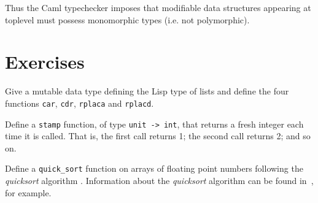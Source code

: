 Thus the Caml typechecker imposes that modifiable data structures appearing
at toplevel must possess monomorphic types (i.e. not polymorphic).



\section*{Exercises}

\begin{exo}\label{Annot:4}
Give a mutable data type defining the Lisp type of lists and define
the four functions {\tt car}, {\tt cdr}, {\tt rplaca} and {\tt rplacd}.
\end{exo}

\begin{exo}\label{Annot:5}
Define a \verb"stamp" function, of type \verb"unit -> int", that
returns a fresh integer each time it is called. That is, the first
call returns 1; the second call returns 2; and so on.
\end{exo}

\begin{exo}\label{Annot:6}
Define a \verb|quick_sort| function on arrays of floating point
numbers following the {\em quicksort} algorithm \cite{Quicksort}.
Information about the {\em quicksort} algorithm can be found
in~\cite{SedgewickPascal}, for example.
\end{exo}
